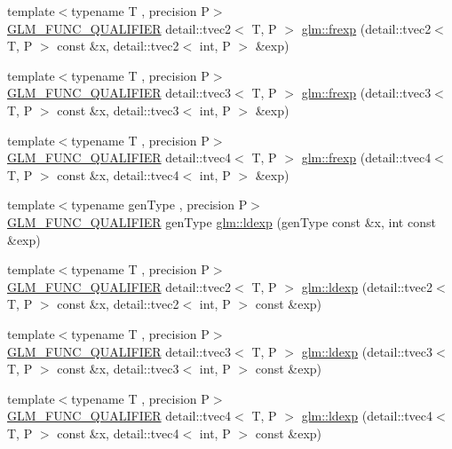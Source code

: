 \begin{DoxyCompactItemize}
\item 
{\footnotesize template$<$typename T , precision P$>$ }\\\hyperlink{setup_8hpp_a33fdea6f91c5f834105f7415e2a64407}{G\+L\+M\+\_\+\+F\+U\+N\+C\+\_\+\+Q\+U\+A\+L\+I\+F\+I\+ER} detail\+::tvec2$<$ T, P $>$ \hyperlink{namespaceglm_a555adf9521601a3823c9d573333c1360}{glm\+::frexp} (detail\+::tvec2$<$ T, P $>$ const \&x, detail\+::tvec2$<$ int, P $>$ \&exp)
\item 
{\footnotesize template$<$typename T , precision P$>$ }\\\hyperlink{setup_8hpp_a33fdea6f91c5f834105f7415e2a64407}{G\+L\+M\+\_\+\+F\+U\+N\+C\+\_\+\+Q\+U\+A\+L\+I\+F\+I\+ER} detail\+::tvec3$<$ T, P $>$ \hyperlink{namespaceglm_afb702f1a288d4a5010b732b5bbbfaad6}{glm\+::frexp} (detail\+::tvec3$<$ T, P $>$ const \&x, detail\+::tvec3$<$ int, P $>$ \&exp)
\item 
{\footnotesize template$<$typename T , precision P$>$ }\\\hyperlink{setup_8hpp_a33fdea6f91c5f834105f7415e2a64407}{G\+L\+M\+\_\+\+F\+U\+N\+C\+\_\+\+Q\+U\+A\+L\+I\+F\+I\+ER} detail\+::tvec4$<$ T, P $>$ \hyperlink{namespaceglm_ad81e7dc1f395a13d442c19fa6b90b9d2}{glm\+::frexp} (detail\+::tvec4$<$ T, P $>$ const \&x, detail\+::tvec4$<$ int, P $>$ \&exp)
\item 
{\footnotesize template$<$typename gen\+Type , precision P$>$ }\\\hyperlink{setup_8hpp_a33fdea6f91c5f834105f7415e2a64407}{G\+L\+M\+\_\+\+F\+U\+N\+C\+\_\+\+Q\+U\+A\+L\+I\+F\+I\+ER} gen\+Type \hyperlink{namespaceglm_a5c453639629fa99ccaa3438e455866b3}{glm\+::ldexp} (gen\+Type const \&x, int const \&exp)
\item 
{\footnotesize template$<$typename T , precision P$>$ }\\\hyperlink{setup_8hpp_a33fdea6f91c5f834105f7415e2a64407}{G\+L\+M\+\_\+\+F\+U\+N\+C\+\_\+\+Q\+U\+A\+L\+I\+F\+I\+ER} detail\+::tvec2$<$ T, P $>$ \hyperlink{namespaceglm_af792ae464dc2c26112c9387f633d1c51}{glm\+::ldexp} (detail\+::tvec2$<$ T, P $>$ const \&x, detail\+::tvec2$<$ int, P $>$ const \&exp)
\item 
{\footnotesize template$<$typename T , precision P$>$ }\\\hyperlink{setup_8hpp_a33fdea6f91c5f834105f7415e2a64407}{G\+L\+M\+\_\+\+F\+U\+N\+C\+\_\+\+Q\+U\+A\+L\+I\+F\+I\+ER} detail\+::tvec3$<$ T, P $>$ \hyperlink{namespaceglm_a81c3a6c6aed7a170864f9873dc422bc2}{glm\+::ldexp} (detail\+::tvec3$<$ T, P $>$ const \&x, detail\+::tvec3$<$ int, P $>$ const \&exp)
\item 
{\footnotesize template$<$typename T , precision P$>$ }\\\hyperlink{setup_8hpp_a33fdea6f91c5f834105f7415e2a64407}{G\+L\+M\+\_\+\+F\+U\+N\+C\+\_\+\+Q\+U\+A\+L\+I\+F\+I\+ER} detail\+::tvec4$<$ T, P $>$ \hyperlink{namespaceglm_a996ba8bb1830a08ebc28317b6dc71523}{glm\+::ldexp} (detail\+::tvec4$<$ T, P $>$ const \&x, detail\+::tvec4$<$ int, P $>$ const \&exp)
\end{DoxyCompactItemize}
